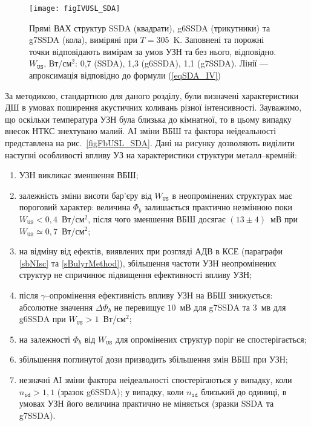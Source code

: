 \begin{figure}[b]
\center
\texttt{[image: figIVUSL\_SDA]}
\caption{\label{figIVUSL_SDA}
Прямі  ВАХ  структур SSDA (квадрати), g6SSDA (трикутники) та g7SSDA (кола), виміряні при $T=305$~K.
Заповнені та порожні точки відповідають вимірам за умов УЗН та без нього, відповідно.
$W_\mathtt{US}$, Вт/см$^2$: 0,7 (SSDA), 1,3 (g6SSDA), 1,1 (g7SSDA).
Лінії --- апроксимація відповідно до формули (\ref{eqSDA_IV})
}%
\end{figure}

За методикою, стандартною для даного розділу, були визначені характеристики ДШ в умовах поширення акустичних коливань різної інтенсивності.
Зауважимо, що оскільки температура УЗН була близька до кімнатної, то в цьому випадку внесок НТКС знехтувано малий.
АІ зміни ВБШ та фактора неідеальності представлена на рис.~\ref{figFbUSL_SDA}.
Дані на рисунку дозволяють виділити наступні особливості  впливу УЗ на характеристики структури металл--кремній:
\begin{enumerate}[label=\asbuk*),leftmargin=0em,itemindent=1.5em]
\item УЗН викликає зменшення ВБШ;

\item залежність зміни висоти бар'єру від $W_\mathtt{US}$ в неопромінених структурах має пороговий характер:
     величина $\Phi_b$ залишається практично незмінною поки \mbox{$W_\mathtt{US}<0,4$~Вт/см$^2$}, після чого
    зменшення ВБШ досягає $(13\pm4)$~мВ при $W_\mathtt{US}\simeq0,7$~Вт/см$^2$;

\item на відміну від ефектів, виявлених при розгляді АДВ в КСЕ (параграфи \ref{sbNIsc} та \ref{sBulyrMethod}), збільшення частоти УЗН неопромінених структур не спричинює
підвищення ефективності впливу УЗН;

\item після $\gamma$--опромінення ефективність впливу УЗН на ВБШ знижується:
абсолютне значення $\Delta\Phi_b$ не перевищує $10$~мВ для g7SSDA та $3$~мв  для g6SSDA при $W_\mathtt{US}>1$~Вт/см$^2$;

\item на залежності $\Phi_b$ від $W_\mathtt{US}$ для опромінених структур поріг не спостерігається;

\item збільшення поглинутої дози призводить збільшення змін ВБШ при УЗН;

\item незначні АІ зміни фактора неідеальності спостерігаються у випадку, коли $n_\mathtt{id}>1,1$ (зразок g6SSDA);
    у випадку, коли $n_\mathtt{id}$ близький до одиниці, в умовах УЗН його величина практично не міняється (зразки SSDA та g7SSDA).
\end{enumerate}

